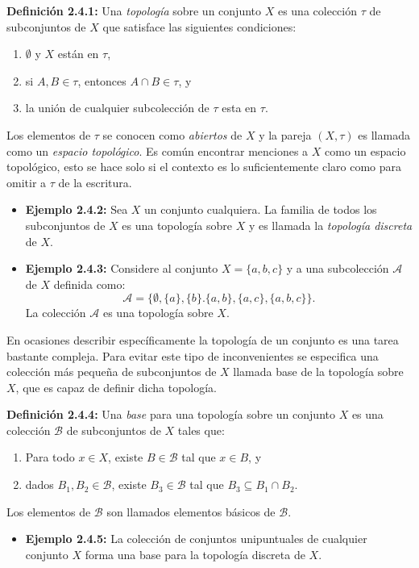 \textbf{Definición 2.4.1:} Una \textit{topología} sobre un conjunto $X$ es una colección $\tau$ de subconjuntos de $X$ que satisface las siguientes condiciones:
\begin{enumerate}
    \item $\emptyset$ y $X$ están en $\tau$,
    \item si $A,B\in\tau$, entonces $A\cap B\in\tau$, y 
    \item la unión de cualquier subcolección de $\tau$ esta en $\tau$.
\end{enumerate}
Los elementos de $\tau$ se conocen como \textit{abiertos} de $X$ y la pareja $(X,\tau)$ es llamada como un \textit{espacio topológico}. Es común encontrar menciones a $X$ como un espacio topológico, esto se hace solo si el contexto es lo suficientemente claro como para omitir a $\tau$ de la escritura.

\begin{itemize}
    \item \textbf{Ejemplo 2.4.2:} Sea $X$ un conjunto cualquiera. La familia de todos los subconjuntos de $X$ es una topología sobre $X$ y es llamada la \textit{topología discreta} de $X$.
    \item \textbf{Ejemplo 2.4.3:} Considere al conjunto $X=\{a,b,c\}$ y a una subcolección $\mathcal{A}$ de $X$ definida como: 
    $$\mathcal{A}=\{\emptyset,\{a\},\{b\}.\{a,b\},\{a,c\},\{a,b,c\}\}.$$
    La colección $\mathcal{A}$ es una topología sobre $X$.
\end{itemize}

En ocasiones describir específicamente la topología de un conjunto es una tarea bastante compleja. Para evitar este tipo de inconvenientes se especifica una colección más pequeña de subconjuntos de $X$ llamada base de la topología sobre $X$, que es capaz de definir dicha topología. 

\textbf{Definición 2.4.4:} Una \textit{base} para una topología sobre un conjunto $X$ es una colección $\mathcal{B}$ de subconjuntos de $X$ tales que:
\begin{enumerate}
    \item Para todo $x\in X$, existe $B\in\mathcal{B}$ tal que $x\in B$, y
    \item dados $B_1,B_2\in\mathcal{B}$, existe $B_3\in\mathcal{B}$ tal que $B_3\subseteq B_1\cap B_2$.
\end{enumerate}
Los elementos de $\mathcal{B}$ son llamados elementos básicos de $\mathcal{B}$.

\begin{itemize}
    \item \textbf{Ejemplo 2.4.5:} La colección de conjuntos unipuntuales de cualquier conjunto $X$ forma una base para la topología discreta de $X$.
\end{itemize}

